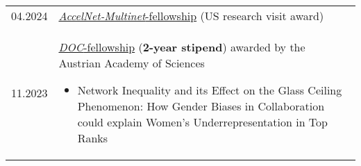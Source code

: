 
\begin{longtable}[l]{@{}p{} p{}}
    04.2024 & \href{https://www.accelnet-multinet.org/}{\emph{AccelNet-Multinet}-fellowship} (US research visit award)\\
    11.2023 & \href{https://stipendien.oeaw.ac.at/en/fellowships/doc}{\emph{DOC}-fellowship} (\textbf{2-year stipend}) awarded by the Austrian Academy of Sciences
    \begin{itemize}
        \item \raggedright Network Inequality and its Effect on the Glass Ceiling Phenomenon: How Gender Biases in Collaboration could explain Women’s Underrepresentation in Top Ranks
    \end{itemize}

\end{longtable}
